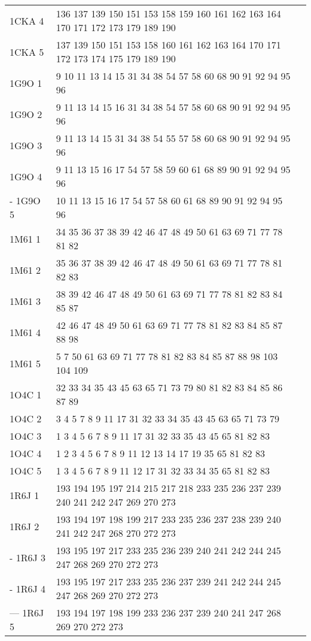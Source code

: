 \begin{table}[!htbp]
{\begin{tabular}{lll}
        1CKA 4 & 136 137 139 150 151 153 158 159 160 161 162 163 164 170 171 172 173 179 189 190 \\
        1CKA 5 & 137 139 150 151 153 158 160 161 162 163 164 170 171 172 173 174 175 179 189 190 \\
        1G9O 1 & 9 10 11 13 14 15 31 34 38 54 57 58 60 68 90 91 92 94 95 96 \\
        1G9O 2 & 9 11 13 14 15 16 31 34 38 54 57 58 60 68 90 91 92 94 95 96 \\
        1G9O 3 & 9 11 13 14 15 31 34 38 54 55 57 58 60 68 90 91 92 94 95 96 \\
        1G9O 4 & 9 11 13 15 16 17 54 57 58 59 60 61 68 89 90 91 92 94 95 96 \\
-       1G9O 5 & 10 11 13 15 16 17 54 57 58 60 61 68 89 90 91 92 94 95 96 \\
        1M61 1 & 34 35 36 37 38 39 42 46 47 48 49 50 61 63 69 71 77 78 81 82 \\
        1M61 2 & 35 36 37 38 39 42 46 47 48 49 50 61 63 69 71 77 78 81 82 83 \\
        1M61 3 & 38 39 42 46 47 48 49 50 61 63 69 71 77 78 81 82 83 84 85 87 \\
        1M61 4 & 42 46 47 48 49 50 61 63 69 71 77 78 81 82 83 84 85 87 88 98 \\
        1M61 5 & 5 7 50 61 63 69 71 77 78 81 82 83 84 85 87 88 98 103 104 109 \\
        1O4C 1 & 32 33 34 35 43 45 63 65 71 73 79 80 81 82 83 84 85 86 87 89 \\
        1O4C 2 & 3 4 5 7 8 9 11 17 31 32 33 34 35 43 45 63 65 71 73 79 \\
        1O4C 3 & 1 3 4 5 6 7 8 9 11 17 31 32 33 35 43 45 65 81 82 83 \\
        1O4C 4 & 1 2 3 4 5 6 7 8 9 11 12 13 14 17 19 35 65 81 82 83 \\
        1O4C 5 & 1 3 4 5 6 7 8 9 11 12 17 31 32 33 34 35 65 81 82 83 \\
        1R6J 1 & 193 194 195 197 214 215 217 218 233 235 236 237 239 240 241 242 247 269 270 273 \\
        1R6J 2 & 193 194 197 198 199 217 233 235 236 237 238 239 240 241 242 247 268 270 272 273 \\
-       1R6J 3 & 193 195 197 217 233 235 236 239 240 241 242 244 245 247 268 269 270 272 273 \\
-       1R6J 4 & 193 195 197 217 233 235 236 237 239 241 242 244 245 247 268 269 270 272 273 \\
---     1R6J 5 & 193 194 197 198 199 233 236 237 239 240 241 247 268 269 270 272 273 \\

\end{tabular}}
\end{table}
